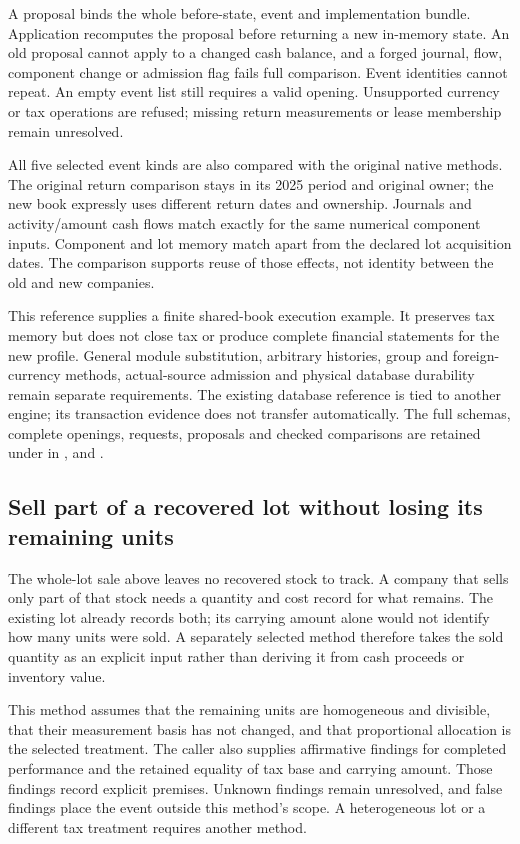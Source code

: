 A proposal binds the whole before-state, event and implementation bundle.
Application recomputes the proposal before returning a new in-memory state.
An old proposal cannot apply to a changed cash balance, and a forged journal,
flow, component change or admission flag fails full comparison. Event identities
cannot repeat. An empty event list still requires a valid opening. Unsupported
currency or tax operations are refused; missing return measurements or lease
membership remain unresolved.

All five selected event kinds are also compared with the original native
methods. The original return comparison stays in its 2025 period and original
owner; the new book expressly uses different return dates and ownership.
Journals and activity/amount cash flows match exactly for the same numerical
component inputs. Component and lot memory match apart from the declared lot
acquisition dates. The comparison supports reuse of those effects, not identity
between the old and new companies.

This reference supplies a finite shared-book execution example. It preserves
tax memory but does not close tax or produce complete financial statements for
the new profile. General module substitution, arbitrary histories, group and
foreign-currency methods, actual-source admission and physical database
durability remain separate requirements. The existing database reference is
tied to another engine; its transaction evidence does not transfer automatically.
The full schemas, complete openings, requests, proposals and checked comparisons
are retained under  in
,
 and
.

\subsection{Sell part of a recovered lot without losing its remaining units}
The whole-lot sale above leaves no recovered stock to track. A company that
sells only part of that stock needs a quantity and cost record for what remains.
The existing lot already records both; its carrying amount alone would not
identify how many units were sold. A separately selected method therefore
takes the sold quantity as an explicit input rather than deriving it from cash
proceeds or inventory value.

This method assumes that the remaining units are homogeneous and divisible,
that their measurement basis has not changed, and that proportional allocation
is the selected treatment. The caller also supplies affirmative findings for
completed performance and the retained equality of tax base and carrying
amount. Those findings record explicit premises. Unknown findings remain
unresolved, and false findings place the event outside this method's scope.
A heterogeneous lot or a different tax treatment requires another method.

